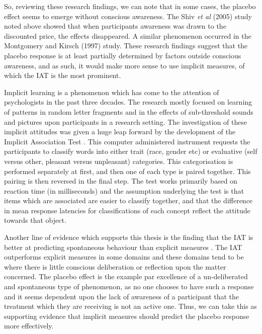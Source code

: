 So, reviewing these research findings, we can note that in some cases, the placebo effect seems to emerge without conscious awareness. The Shiv \textit{et al} (2005) study noted above showed that when participants awareness was drawn to the discounted price, the effects disappeared. A similar phenomenon occurred in the Montgomery and Kirsch (1997) study. These research findings suggest that the placebo response is at least partially determined by factors outside conscious awareness, and as such, it would make more sense to use implicit measures, of which the IAT is the most prominent. 

Implicit learning is a phenomenon which has come to the attention of psychologists in the past three decades. The research mostly focused on learning of patterns in random letter fragments and in the effects of sub-threshold sounds and pictures upon participants in a research setting. The investigation of these implicit attitudes was given a huge leap forward by the development of the Implicit Association Test \cite{Greenwald1998}. This computer administered instrument requests the participants to classify words into either trait (race, gender etc) or evaluative (self versus other, pleasant versus unpleasant) categories. This categorisation is performed separately at first, and then one of each type is paired together. This pairing is then reversed in the final step. The test works primarily based on reaction time (in milliseconds) and the assumption underlying the test is that items which are associated are easier to classify together, and that the difference in mean response latencies for classifications of each concept reflect the attitude towards that object. 


Another line of evidence which supports this thesis is the finding that the IAT is better at predicting spontaneous behaviour than explicit measures \cite{Conner2005,Hofmann2005}. The IAT outperforms explicit measures in some domains \cite{Greenwald2009} and these domains tend to be where there is little conscious deliberation or reflection upon the matter concerned. The placebo effect is the example par excellence of a un-deliberated and spontaneous  type of phenomenon, as no one chooses to have such a response and it seems dependent upon the lack of awareness of a participant that the treatment which they are receiving is not an active one. Thus, we can take this as supporting evidence that implicit measures should predict the placebo response more effectively. 

